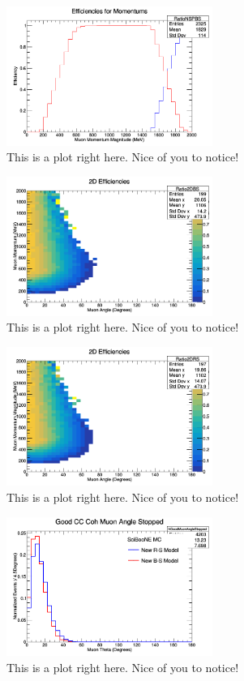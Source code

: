 \documentclass[11pt]{article}
\begin{document}
\begin{figure}[H]
\centering
\includegraphics[width=0.6\textwidth]{ANMCombinedPlotsImages/4-ANMCombinedPlots.png}
\caption{This is a plot right here. Nice of you to notice!}
\end{figure}

\begin{figure}[H]
\centering
\includegraphics[width=0.6\textwidth]{ANMCombinedPlotsImages/5-ANMCombinedPlots.png}
\caption{This is a plot right here. Nice of you to notice!}
\end{figure}

\begin{figure}[H]
\centering
\includegraphics[width=0.6\textwidth]{ANMCombinedPlotsImages/6-ANMCombinedPlots.png}
\caption{This is a plot right here. Nice of you to notice!}
\end{figure}

\begin{figure}[H]
\centering
\includegraphics[width=0.6\textwidth]{ANMCombinedPlotsImages/7-ANMCombinedPlots.png}
\caption{This is a plot right here. Nice of you to notice!}
\end{figure}
\end{document}
